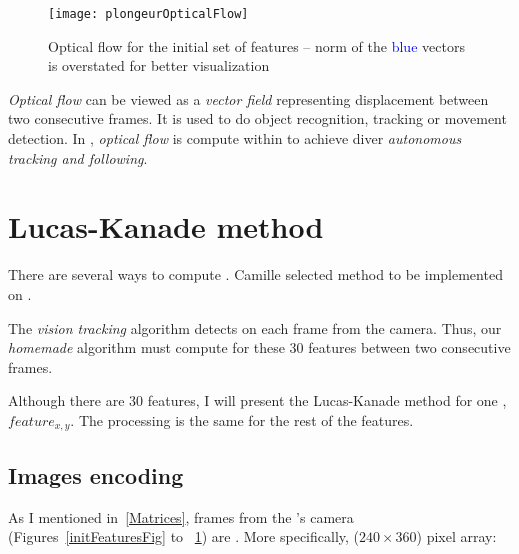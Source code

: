 \begin{figure}[!htbp]
	\centering
	\texttt{[image: plongeurOpticalFlow]}
	\caption{Optical flow for the initial set of features -- \small{norm of the \textcolor{blue}{blue} vectors is overstated for better visualization}}
	\label{opticalFlowFig}
\end{figure}
\FloatBarrier

\emph{Optical flow} can be viewed as a \emph{vector field} representing  displacement between two consecutive frames. It is used to do object recognition, tracking or movement detection. In \iBubble, \emph{optical flow} is compute within  to achieve diver \emph{autonomous tracking and following}.\par


\section{Lucas-Kanade method}

There are several ways to compute . Camille selected  method to be implemented on \vc.

The \emph{vision tracking} algorithm detects  on each frame from the camera. Thus, our \emph{homemade} algorithm must compute  for these 30 features between two consecutive frames.

Although there are 30 features, I will present the Lucas-Kanade method for one , $feature_{x,y}$. The processing is the same for the rest of the features.

\subsection{Images encoding}

As I mentioned in~\ref{Matrices}, frames from the \rasp's camera (Figures~\ref{initFeaturesFig} to ~\ref{opticalFlowFig}) are . More specifically, ($240\times 360$) pixel array:

